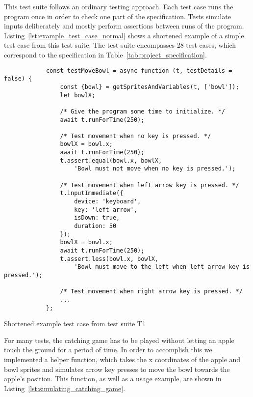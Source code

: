 This test suite follows an ordinary testing approach.
Each test case runs the program once in order to check one part of the specification.
Tests simulate inputs deliberately and mostly perform assertions between runs of the program.
Listing~\ref{lst:example_test_case_normal} shows a shortened example of a simple test case from this test suite.
The test suite encompasses 28 test cases, which correspond to the specification in Table~\ref{tab:project_specification}.
\parspace

\begin{listing}[htpb]
    \centering
    \begin{minipage}{.70\textwidth}
        \begin{verbatim}
            const testMoveBowl = async function (t, testDetails = false) {
                const {bowl} = getSpritesAndVariables(t, ['bowl']);
                let bowlX;

                /* Give the program some time to initialize. */
                await t.runForTime(250);

                /* Test movement when no key is pressed. */
                bowlX = bowl.x;
                await t.runForTime(250);
                t.assert.equal(bowl.x, bowlX,
                    'Bowl must not move when no key is pressed.');

                /* Test movement when left arrow key is pressed. */
                t.inputImmediate({
                    device: 'keyboard',
                    key: 'left arrow',
                    isDown: true,
                    duration: 50
                });
                bowlX = bowl.x;
                await t.runForTime(250);
                t.assert.less(bowl.x, bowlX,
                    'Bowl must move to the left when left arrow key is pressed.');

                /* Test movement when right arrow key is pressed. */
                ...
            };
        \end{verbatim}
    \end{minipage}

    \caption{Shortened example test case from test suite T1}
    \label{lst:example_test_case_normal}
\end{listing}

For many tests, the catching game has to be played without letting an apple touch the ground for a period of time.
In order to accomplish this we implemented a helper function,
which takes the x coordinates of the apple and bowl sprites and
simulates arrow key presses to move the bowl towards the apple's position.
This function, as well as a usage example, are shown in Listing~\ref{lst:simulating_catching_game}.

